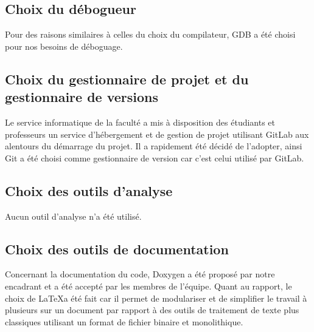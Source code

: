     \subsection{Choix du débogueur}
Pour des raisons similaires à celles du choix du compilateur, GDB a été choisi pour nos besoins de déboguage.

    \subsection{Choix du gestionnaire de projet et du gestionnaire de versions}
Le service informatique de la faculté a mis à disposition des étudiants et professeurs un service d'hébergement et de gestion de projet utilisant GitLab aux alentours du démarrage du projet.
Il a rapidement été décidé de l'adopter, ainsi Git a été choisi comme gestionnaire de version car c'est celui utilisé par GitLab.

    \subsection{Choix des outils d'analyse}
Aucun outil d'analyse n'a été utilisé.

    \subsection{Choix des outils de documentation}
Concernant la documentation du code, Doxygen a été proposé par notre encadrant et a été accepté par les membres de l'équipe.
Quant au rapport, le choix de \LaTeX a été fait car il permet de modulariser et de simplifier le travail à plusieurs sur un document par rapport à des outils de traitement de texte plus classiques utilisant un format de fichier binaire et monolithique.
